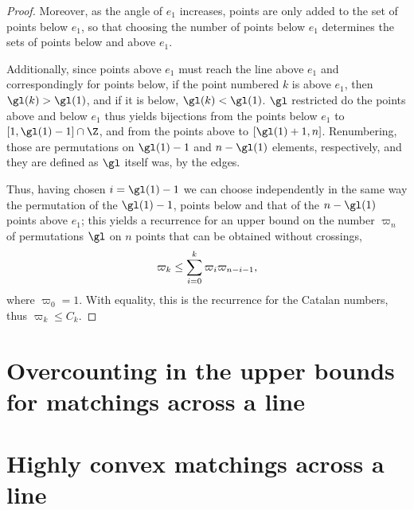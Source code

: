 \documentclass[10pt, a4paper, twoside]{basestyle}
\begin{document}
\begin{theorem}
\begin{proof}
Moreover, as the angle of $e_1$ increases, points are only added to the set of points below $e_1$, so that choosing
the number of points below $e_1$ determines the sets of points below and above $e_1$.

Additionally, since points above $e_1$ must reach the line above $e_1$ and correspondingly for points below,
if the point numbered $k$ is above $e_1$, then $\gl(k) > \gl(1)$, and if it is below, $\gl(k) < \gl(1)$.
$\gl$ restricted do the points above and below $e_1$ thus yields bijections from the points
below $e_1$ to $[1, \gl(1) - 1] \Intersection \Z$, and from the points above to $[\gl(1) + 1, n]$.
Renumbering, those are permutations on $\gl(1) - 1$ and $n-\gl(1)$ elements, respectively, and they are
defined as $\gl$ itself was, by the edges.

Thus, having chosen $i = \gl(1) - 1$ we can choose independently in the same way the permutation of the $\gl(1) - 1$,
points below and that of the $n - \gl(1)$ points above $e_1$; this yields a recurrence for an upper bound on
the number $\varpi_n$ of permutations $\gl$ on $n$ points that can be obtained without crossings,
\[\varpi_k\leq\sum{i=0}[k]\varpi_{i}\varpi_{n-i-1}\text,\]
where $\varpi_0 = 1$. With equality, this is the recurrence for the Catalan numbers, thus
$\varpi_k\leq C_k$.
\end{proof}
\end{theorem}

\section{Overcounting in the upper bounds for matchings across a line}
\section{Highly convex matchings across a line}

\clearpage
\nocite{*}


\end{document}
